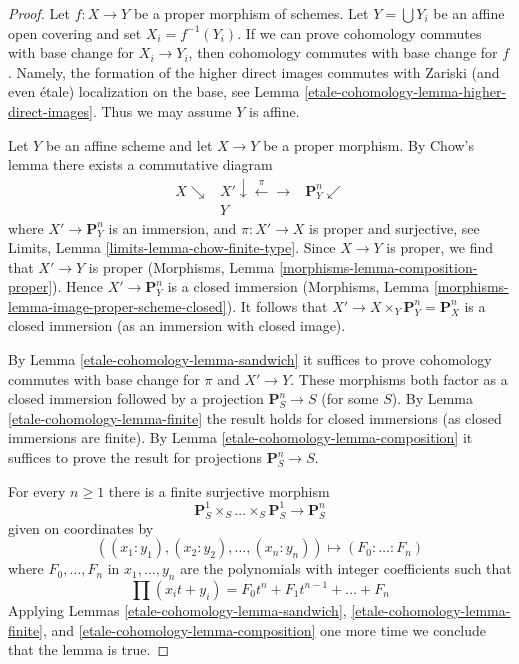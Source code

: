 \begin{proof}
Let $f : X \to Y$ be a proper morphism of schemes.
Let $Y = \bigcup Y_i$ be an affine open covering
and set $X_i = f^{-1}(Y_i)$. If we can prove
cohomology commutes with base change for $X_i \to Y_i$,
then cohomology commutes with base change for $f$.
Namely, the formation of the higher direct images
commutes with Zariski (and even \'etale) localization
on the base, see
Lemma \ref{etale-cohomology-lemma-higher-direct-images}.
Thus we may assume $Y$ is affine.

\medskip\noindent
Let $Y$ be an affine scheme and let $X \to Y$ be a proper morphism.
By Chow's lemma there exists a commutative diagram
$$
\begin{array}{ccc}X \searrow & X' \downarrow\overset{\pi}{\longleftarrow}\longrightarrow & \mathbf{P}^n_Y \swarrow \\  & Y & \end{array}
$$
where $X' \to \mathbf{P}^n_Y$ is an immersion, and
$\pi : X' \to X$ is proper and surjective, see
Limits, Lemma \ref{limits-lemma-chow-finite-type}.
Since $X \to Y$ is proper, we find that $X' \to Y$ is proper
(Morphisms, Lemma \ref{morphisms-lemma-composition-proper}).
Hence $X' \to \mathbf{P}^n_Y$ is a closed immersion
(Morphisms, Lemma \ref{morphisms-lemma-image-proper-scheme-closed}).
It follows that $X' \to X \times_Y \mathbf{P}^n_Y = \mathbf{P}^n_X$
is a closed immersion (as an immersion with closed image).

\medskip\noindent
By Lemma \ref{etale-cohomology-lemma-sandwich}
it suffices to prove cohomology commutes with base change for
$\pi$ and $X' \to Y$. These morphisms both factor as a closed
immersion followed by a projection $\mathbf{P}^n_S \to S$ (for some $S$).
By Lemma \ref{etale-cohomology-lemma-finite} the result holds for closed
immersions (as closed immersions are finite).
By Lemma \ref{etale-cohomology-lemma-composition} it suffices to prove the
result for projections $\mathbf{P}^n_S \to S$.

\medskip\noindent
For every $n \geq 1$ there is a finite surjective morphism
$$
\mathbf{P}^1_S \times_S \ldots \times_S \mathbf{P}^1_S
\longrightarrow
\mathbf{P}^n_S
$$
given on coordinates by
$$
((x_1 : y_1), (x_2 : y_2), \ldots, (x_n : y_n))
\longmapsto
(F_0 : \ldots : F_n)
$$
where $F_0, \ldots, F_n$ in $x_1, \ldots, y_n$
are the polynomials with integer coefficients such that
$$
\prod (x_i t + y_i) = F_0 t^n + F_1 t^{n - 1} + \ldots + F_n
$$
Applying
Lemmas \ref{etale-cohomology-lemma-sandwich}, \ref{etale-cohomology-lemma-finite}, and \ref{etale-cohomology-lemma-composition}
one more time we conclude that the lemma is true.
\end{proof}

